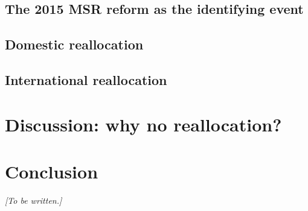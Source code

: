\documentclass[11pt, reqno]{amsart}
\theoremstyle{definition}
\begin{document}
\subsection{The 2015 MSR reform as the identifying event}\label{sec:msr_identification}


\subsection{Domestic reallocation}\label{sec:domestic}


\subsection{International reallocation}\label{sec:international}


\section{Discussion: why no reallocation?}\label{sec:discussion}


\section{Conclusion}\label{sec:conclusion}

\textit{[To be written.]}

\newpage



\newpage
\appendix

\end{document}
